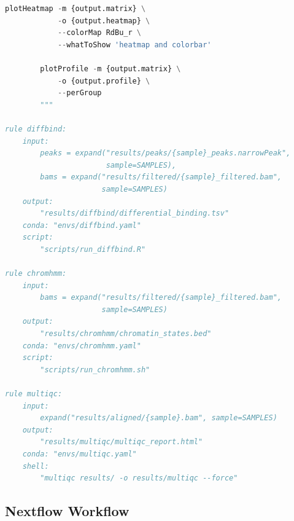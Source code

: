 \begin{lstlisting}[language=Python, caption={Snakemake workflow for ChIP-seq/CUT\&Tag analysis.}, label={lst:histones:snakemake}]
        plotHeatmap -m {output.matrix} \
            -o {output.heatmap} \
            --colorMap RdBu_r \
            --whatToShow 'heatmap and colorbar'

        plotProfile -m {output.matrix} \
            -o {output.profile} \
            --perGroup
        """

rule diffbind:
    input:
        peaks = expand("results/peaks/{sample}_peaks.narrowPeak",
                       sample=SAMPLES),
        bams = expand("results/filtered/{sample}_filtered.bam",
                      sample=SAMPLES)
    output:
        "results/diffbind/differential_binding.tsv"
    conda: "envs/diffbind.yaml"
    script:
        "scripts/run_diffbind.R"

rule chromhmm:
    input:
        bams = expand("results/filtered/{sample}_filtered.bam",
                      sample=SAMPLES)
    output:
        "results/chromhmm/chromatin_states.bed"
    conda: "envs/chromhmm.yaml"
    script:
        "scripts/run_chromhmm.sh"

rule multiqc:
    input:
        expand("results/aligned/{sample}.bam", sample=SAMPLES)
    output:
        "results/multiqc/multiqc_report.html"
    conda: "envs/multiqc.yaml"
    shell:
        "multiqc results/ -o results/multiqc --force"
\end{lstlisting}

\subsection{Nextflow Workflow}
\label{subsec:histones:nextflow}

